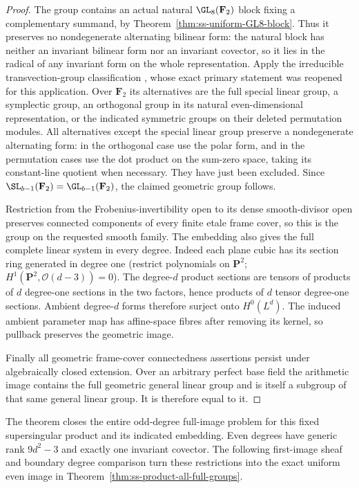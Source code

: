 \begin{proof}
The group contains an actual natural $\GL_8(\mathbf F_2)$ block
fixing a complementary summand, by
Theorem~\ref{thm:ss-uniform-GL8-block}. Thus it preserves no
nondegenerate alternating bilinear form: the natural block has
neither an invariant bilinear form nor an invariant covector,
so it lies in the radical of any invariant form on the whole
representation.
Apply the irreducible transvection-group classification
\cite[Theorem~3.6, printed p.~22]{KantorSeress2001}, whose exact
primary statement was reopened for this application. Over
$\mathbf F_2$ its alternatives are the full special linear
group, a symplectic group, an orthogonal group in its natural
even-dimensional representation, or the indicated symmetric
groups on their deleted permutation modules. All alternatives
except the special linear group preserve a nondegenerate
alternating form: in the orthogonal case use the polar form,
and in the permutation cases use the dot product on the
sum-zero space, taking its constant-line quotient when necessary.
They have just been excluded. Since
$\SL_{b-1}(\mathbf F_2)=\GL_{b-1}(\mathbf F_2)$, the claimed
geometric group follows.

Restriction from the Frobenius-invertibility open to its dense
smooth-divisor open preserves connected components of every finite
etale frame cover, so this is the group on the requested smooth
family. The embedding also gives the full complete linear system
in every degree. Indeed each plane cubic has its section ring
generated in degree one (restrict polynomials on $\mathbf P^2$;
$H^1(\mathbf P^2,\mathcal O(d-3))=0$). The degree-$d$ product
sections are tensors of products of $d$ degree-one sections in
the two factors, hence products of $d$ tensor degree-one sections.
Ambient degree-$d$ forms therefore surject onto $H^0(L^d)$.
The induced ambient parameter map has affine-space fibres after
removing its kernel, so pullback preserves the geometric image.

Finally all geometric frame-cover connectedness assertions persist
under algebraically closed extension. Over an arbitrary perfect
base field the arithmetic image contains the full geometric
general linear group and is itself a subgroup of that same
general linear group. It is therefore equal to it.
\end{proof}

\begin{remark}\label{auto:A_monodromy:0c2f1cb265b6}

The theorem closes the entire odd-degree full-image problem for
this fixed supersingular product and its indicated embedding.
Even degrees have generic rank $9d^2-3$ and exactly one invariant
covector. The following first-image sheaf and boundary degree comparison
turn these restrictions into the exact uniform even image in
Theorem~\ref{thm:ss-product-all-full-groups}.
\end{remark}


